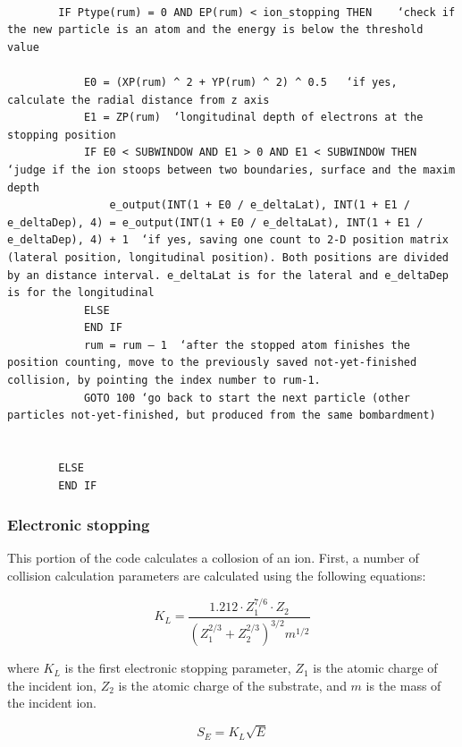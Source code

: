 \documentclass[10pt, reqno]{exam}
\begin{document}
\begin{verbatim}

        IF Ptype(rum) = 0 AND EP(rum) < ion_stopping THEN    ‘check if the new particle is an atom and the energy is below the threshold value
    
            E0 = (XP(rum) ^ 2 + YP(rum) ^ 2) ^ 0.5   ‘if yes, calculate the radial distance from z axis
            E1 = ZP(rum)  ‘longitudinal depth of electrons at the stopping position
            IF E0 < SUBWINDOW AND E1 > 0 AND E1 < SUBWINDOW THEN ‘judge if the ion stoops between two boundaries, surface and the maxim depth
                e_output(INT(1 + E0 / e_deltaLat), INT(1 + E1 / e_deltaDep), 4) = e_output(INT(1 + E0 / e_deltaLat), INT(1 + E1 / e_deltaDep), 4) + 1  ‘if yes, saving one count to 2-D position matrix (lateral position, longitudinal position). Both positions are divided by an distance interval. e_deltaLat is for the lateral and e_deltaDep is for the longitudinal 
            ELSE
            END IF
            rum = rum – 1  ‘after the stopped atom finishes the position counting, move to the previously saved not-yet-finished collision, by pointing the index number to rum-1. 
            GOTO 100 ‘go back to start the next particle (other particles not-yet-finished, but produced from the same bombardment)
    
    
        ELSE
        END IF
\end{verbatim}
\subsubsection{Electronic stopping}
\label{sec:electronic stopping}

This portion of the code calculates a collosion of an ion. First, a number of collision calculation parameters are calculated using the following equations:

\begin{equation}
    K_L = \frac{1.212\cdot Z_1^{7/6}\cdot Z_2}{(Z_1^{2/3} + Z_2^{2/3})^{3/2}m^{1/2}}
    \label{eq:first electronic stopping parameter}
\end{equation}

where $K_L$ is the first electronic stopping parameter, $Z_1$ is the atomic charge of the incident ion, $Z_2$ is the atomic charge of the substrate, and $m$ is the mass of the incident ion. \par

\begin{equation}
    S_E = K_L \sqrt{E}
\end{equation}
\end{document}
